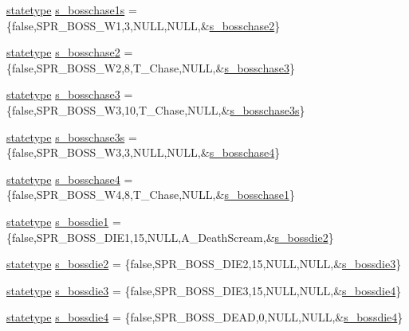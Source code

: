 \begin{DoxyCompactItemize}
\item 
\hyperlink{structstatestruct}{statetype} \hyperlink{WL__ACT2_8C_ac6a3ef80511e594150afa045afd3b9b7}{s\_\-bosschase1s} = \{false,SPR\_\-BOSS\_\-W1,3,NULL,NULL,\&\hyperlink{WL__ACT2_8C_ab62cb1d2594a942a726daa00a0d06bd8}{s\_\-bosschase2}\}
\item 
\hyperlink{structstatestruct}{statetype} \hyperlink{WL__ACT2_8C_ab62cb1d2594a942a726daa00a0d06bd8}{s\_\-bosschase2} = \{false,SPR\_\-BOSS\_\-W2,8,T\_\-Chase,NULL,\&\hyperlink{WL__ACT2_8C_aa9c0a5be56f3585700c347f7a04e9cc5}{s\_\-bosschase3}\}
\item 
\hyperlink{structstatestruct}{statetype} \hyperlink{WL__ACT2_8C_aa9c0a5be56f3585700c347f7a04e9cc5}{s\_\-bosschase3} = \{false,SPR\_\-BOSS\_\-W3,10,T\_\-Chase,NULL,\&\hyperlink{WL__ACT2_8C_a22cc872920a7b45a580d6527e2048420}{s\_\-bosschase3s}\}
\item 
\hyperlink{structstatestruct}{statetype} \hyperlink{WL__ACT2_8C_a22cc872920a7b45a580d6527e2048420}{s\_\-bosschase3s} = \{false,SPR\_\-BOSS\_\-W3,3,NULL,NULL,\&\hyperlink{WL__ACT2_8C_aeef05840498077842df12b23285dabcb}{s\_\-bosschase4}\}
\item 
\hyperlink{structstatestruct}{statetype} \hyperlink{WL__ACT2_8C_aeef05840498077842df12b23285dabcb}{s\_\-bosschase4} = \{false,SPR\_\-BOSS\_\-W4,8,T\_\-Chase,NULL,\&\hyperlink{WL__DEF_8H_a5135f3395ae6c6efc57951117610a58f}{s\_\-bosschase1}\}
\item 
\hyperlink{structstatestruct}{statetype} \hyperlink{WL__ACT2_8C_a154c6599f4cf6660a5c19ed11a022f38}{s\_\-bossdie1} = \{false,SPR\_\-BOSS\_\-DIE1,15,NULL,A\_\-DeathScream,\&\hyperlink{WL__ACT2_8C_a8e438ad726c055153a6e3bf78abb75c9}{s\_\-bossdie2}\}
\item 
\hyperlink{structstatestruct}{statetype} \hyperlink{WL__ACT2_8C_a8e438ad726c055153a6e3bf78abb75c9}{s\_\-bossdie2} = \{false,SPR\_\-BOSS\_\-DIE2,15,NULL,NULL,\&\hyperlink{WL__ACT2_8C_afc0920cb615eb0e224d89899cc8d80ed}{s\_\-bossdie3}\}
\item 
\hyperlink{structstatestruct}{statetype} \hyperlink{WL__ACT2_8C_afc0920cb615eb0e224d89899cc8d80ed}{s\_\-bossdie3} = \{false,SPR\_\-BOSS\_\-DIE3,15,NULL,NULL,\&\hyperlink{WL__ACT2_8C_a498c2621ad46704da3ca7170753775a4}{s\_\-bossdie4}\}
\item 
\hyperlink{structstatestruct}{statetype} \hyperlink{WL__ACT2_8C_a498c2621ad46704da3ca7170753775a4}{s\_\-bossdie4} = \{false,SPR\_\-BOSS\_\-DEAD,0,NULL,NULL,\&\hyperlink{WL__ACT2_8C_a498c2621ad46704da3ca7170753775a4}{s\_\-bossdie4}\}
\item 

\end{DoxyCompactItemize}
